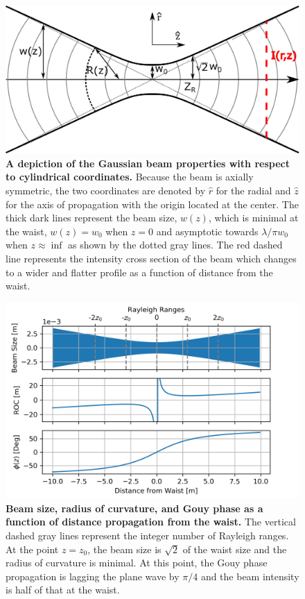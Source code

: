 		\begin{figure}[ht]
			\centering
			\includegraphics[width=0.65 \textwidth]{../Figures/GaussProfile.png}
			\caption[A depiction of the Gaussian beam properties with respect to cylindrical coordinates.]
			{\textbf{A depiction of the Gaussian beam properties with respect to cylindrical coordinates.} Because the beam is axially symmetric, the two coordinates are denoted by $\hat{r}$ for the radial and $\hat{z}$ for the axis of propagation with the origin located at the center. The thick dark lines represent the beam size, $w(z)$, which is minimal at the waist, $w(z)=w_0$ when $z=0$ and asymptotic towards $\lambda/\pi w_0$ when $z \approx \inf$ as shown by the dotted gray lines. The red dashed line represents the intensity cross section of the beam which changes to a wider and flatter profile as a function of distance from the waist.}
			\label{fig:GaussProfile}
		\end{figure}
	
		\begin{figure}[ht]
			\centering
			\includegraphics[width=0.85 \textwidth]{../Figures/GaussBeamParams.png}
			\caption[Beam size, radius of curvature, and Gouy phase as a function of distance propagation from the waist.] 
			{\textbf{Beam size, radius of curvature, and Gouy phase as a function of distance propagation from the waist.} The vertical dashed gray lines represent the integer number of Rayleigh ranges.  At the point $z=z_0$, the beam size is $\sqrt{2}$ of the waist size and the radius of curvature is minimal.  At this point, the Gouy phase propagation is lagging the plane wave by $\pi /4$ and the beam intensity is half of that at the waist.}
			\label{fig:GaussParams}
		\end{figure}

